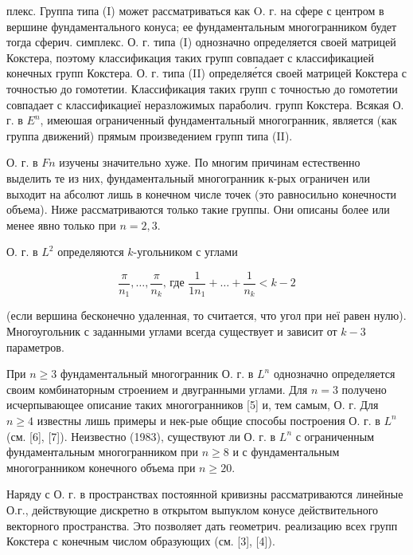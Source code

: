 \documentclass[10pt]{article}
\begin{document}
плекс. Группа типа (I) может рассматриваться как O. г. на сфере с центром в вершине фундаментального конуса; ее фундаментальным многогранником будет тогда сферич. симплекс. О. г. типа (I) однозначно определяется своей матрицей Кокстера, поэтому классификация таких групп совпадает с классификацией конечных групп Кокстера. О. г. типа (II) определяе́тся своей матрицей Кокстера с точностью до гомотетии. Классификация таких групп с точностью до гомотетии совпадает с классификациеї неразложимых параболич. групп Кокстера. Всякая О. г. в $E^{n}$, имеюшая ограниченный фундаментальный многогранник, является (как группа движений) прямым произведением групп типа (II).



О. г. в $F n$ изучены значительно хуже. По многим причинам естественно выделить те из них, фундаментальный многогранник к-рых ограничен или выходит на абсолют лишь в конечном числе точек (это равносильно конечности объема). Ниже рассматриваются только такие группы. Они описаны более или менее явно только при $n=2,3$.



О. г. в $L^{2}$ определяются $k$-угольником с углами



\[

\frac{\pi}{n_{1}}, \ldots, \frac{\pi}{n_{k}} \text {, где } \frac{1}{1 n_{1}}+\ldots+\frac{1}{n_{k}}<k-2

\]



(если вершина бесконечно удаленная, то считается, что угол при неї равен нулю). Многоугольник с заданными углами всегда существует и зависит от $k-3$ параметров.



При $n \geqslant 3$ фундаментальный многогранник О. г. в $L^{n}$ однозначно определяется своим комбинаторным строением и двугранными углами. Для $n=3$ получено исчерпывающее описание таких многогранников [5] и, тем самым, О. г. Для $n \geqslant 4$ известны лишь примеры и нек-рые общие способы построения О. г. в $L^{n}$ (см. [6], [7]). Неизвестно (1983), существуют ли О. г. в $L^{n}$ с ограниченным фундаментальным многогранником при $n \geqslant 8$ и с фундаментальным многогранником конечного объема при $n \geqslant 20$.



Наряду с О. г. в пространствах постоянной кривизны рассматриваются линейные О.г., действующие дискретно в открытом выпуклом конусе действительного векторного пространства. Это позволяет дать геометрич. реализацию всех групп Кокстера с конечным числом образующих (см. [3], [4]).
\end{document}
